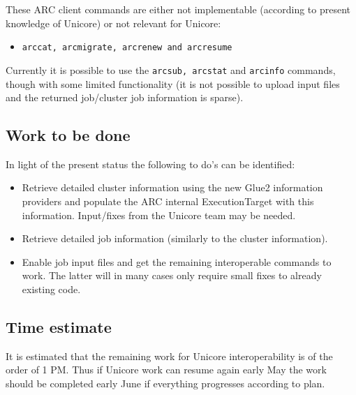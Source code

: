 \documentclass[11pt,oneside,a4paper,english]{article}
\begin{document}
These ARC client commands are either not implementable (according to present knowledge of Unicore) or not relevant for Unicore:
\begin{itemize}
\item{\texttt{arccat, arcmigrate, arcrenew and arcresume}}
\end{itemize}

Currently it is possible to use the \texttt{arcsub, arcstat} and \texttt{arcinfo} commands, though with some limited functionality (it is not possible to upload input files and the returned job/cluster job information is sparse). 

\subsection*{Work to be done}
In light of the present status the following to do's can be identified:

\begin{itemize}
\item{Retrieve detailed cluster information using the new Glue2 information providers and populate the ARC internal ExecutionTarget with this information. Input/fixes from the Unicore team may be needed.}
\item{Retrieve detailed job information (similarly to the cluster information).}
\item{Enable job input files and get the remaining interoperable commands to work. The latter will in many cases only require small fixes to already existing code.}
\end{itemize}
\subsection*{Time estimate}
It is estimated that the remaining work for Unicore interoperability is of the order of 1 PM. Thus if Unicore work can resume again early May the work should be completed early June if everything progresses according to plan.
\end{document}
